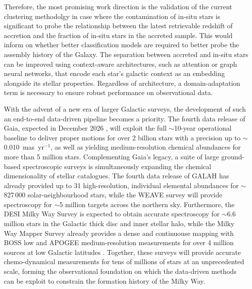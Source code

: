 Therefore, the most promising work direction is the validation of the current clustering methodolgy in case where the 
contamination of in-situ stars is significant to probe the relationship between the latest retrievable
redshift of accretion and the fraction of in-situ stars in the accreted sample. This would inform on 
whether better classification models are required to better probe the assembly history of the Galaxy. 
The separation between accreted and in-situ stars can be improved using context-aware architectures, 
such as attention or graph neural networks, that encode each star's galactic context as an 
embedding alongside its stellar properties. 
Regardless of architecture, a domain-adaptation term is necessary to ensure 
robust performance on observational data.

With the advent of a new era of larger Galactic surveys, the development of such an end-to-end data-driven pipeline becomes a priority.
The fourth data release of Gaia, expected in December 2026 \citep{GaiaCollaboration2016a}, 
will exploit the full $\sim$10-year operational baseline to deliver proper motions for over 2 billion stars with a precision up to $\sim$0.010~mas~yr$^{-1}$, 
as well as yielding medium-resolution chemical abundances for more than 5 million stars.
Complementing Gaia's legacy, a suite of large ground-based spectroscopic surveys is simultaneously expanding the chemical dimensionality of stellar catalogues.
The fourth data release of GALAH \citep{Buder2025} has already provided up to 31 high-resolution, individual elemental abundances for $\sim$827\,000 solar-neighbourhood stars, while 
the WEAVE survey \citep{Dalton2014} will provide spectroscopy for $\sim$5 million targets across the northern sky. 
Furthermore, the DESI Milky Way Survey \citep{Cooper2023} is expected to obtain accurate spectroscopy for $\sim$6.6 million stars in the Galactic thick disc and inner stellar halo, while the
Milky Way Mapper Survey already provides a dense and continuouse mapping with BOSS low and APOGEE medium-resolution measurements for over 4 million sources at low Galactic latitudes \citep{Meszaros2025}.  
Together, these surveys will provide accurate chemo-dynamical measurements for tens of millions of stars at an unprecedented scale, 
forming the observational foundation on which the data-driven methods can be exploit to constrain the formation history of the Milky Way. 

